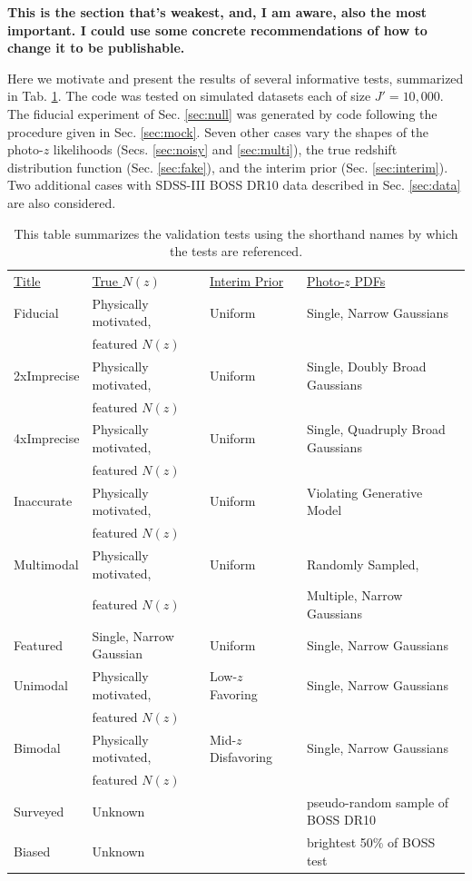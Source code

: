 \documentclass[preprint]{aastex}
\newcommand{\textul}{\underline}
\begin{document}
\textbf{This is the section that's weakest, and, I am aware, also the most 
important.  I could use some concrete recommendations of how to change it to be 
publishable.}

Here we motivate and present the results of several informative tests, 
summarized in Tab. \ref{tab:key}.  The code was tested on simulated datasets 
each of size $J'=10,000$.  The fiducial experiment of Sec. \ref{sec:null} was 
generated by code following the procedure given in Sec. \ref{sec:mock}.  Seven 
other cases vary the shapes of the photo-$z$ likelihoods (Secs. \ref{sec:noisy} 
and \ref{sec:multi}), the true redshift distribution function (Sec. 
\ref{sec:fake}), and the interim prior (Sec. \ref{sec:interim}).  Two 
additional cases with SDSS-III BOSS DR10 data described in Sec. \ref{sec:data} 
are also considered.

\begin{table}
\begin{tabular}{llll}
\textul{Title} & \textul{True $N(z)$} & \textul{Interim Prior} & 
\textul{Photo-$z$ PDFs}\\
Fiducial & Physically motivated, & Uniform & Single, Narrow Gaussians\\
& featured $N(z)$ &&\\
2xImprecise & Physically motivated, & Uniform & Single, Doubly Broad Gaussians\\
& featured $N(z)$ &&\\
4xImprecise & Physically motivated, & Uniform & Single, Quadruply Broad 
Gaussians\\
& featured $N(z)$ &&\\
Inaccurate & Physically motivated, & Uniform & Violating Generative Model\\
& featured $N(z)$ &&\\
Multimodal & Physically motivated, & Uniform & Randomly Sampled,\\
& featured $N(z)$ && Multiple, Narrow Gaussians\\
Featured & Single, Narrow Gaussian & Uniform & Single, Narrow Gaussians\\
Unimodal & Physically motivated, & Low-$z$ Favoring & Single, Narrow Gaussians\\
& featured $N(z)$ &&\\
Bimodal & Physically motivated, & Mid-$z$ Disfavoring & Single, Narrow 
Gaussians\\
& featured $N(z)$ &&\\
Surveyed & Unknown & \citet{Sheldon2012} & pseudo-random sample of BOSS DR10\\
Biased & Unknown & \citet{Sheldon2012} & brightest 50\% of BOSS test
\end{tabular}
\caption{This table summarizes the validation tests using the shorthand names 
by which the tests are referenced.}
\label{tab:key}
\end{table}
\end{document}
